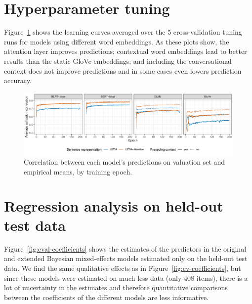 \documentclass[11pt,a4paper]{article}
\newcommand{\figref}[1]{Figure~\ref{#1}}
\begin{document}
\section{Hyperparameter tuning}
\label{app:hyperparameter} \figref{fig:learning-curves} shows the  learning curves averaged over the 5 cross-validation tuning runs for models using different word embeddings. As these plots show, the attention layer improves predictions; contextual word embeddings lead to better results than the static GloVe embeddings; and including the conversational context does not improve predictions and in some cases even lowers prediction accuracy.

\begin{figure}[h]
\centering
	\includegraphics[width=\textwidth,trim={0 0.4cm 0 0},clip]{./images/val-corr.pdf}
	\caption{Correlation between each model's predictions on valuation set and empirical means, by training epoch.}
	\label{fig:learning-curves}
\end{figure}


\section{Regression analysis on held-out test data}
\label{app:regression}
\noindent\figref{fig:eval-coefficients} shows the estimates of the predictors in the original and extended Bayesian mixed-effects models estimated only on the held-out test data. We find the same qualitative effects as in \figref{fig:cv-coefficients}, but since these models were estimated on much less data (only 408 items), there is a lot of uncertainty in the estimates and therefore quantitative comparisons between the coefficients of the different models are less informative.
\end{document}
